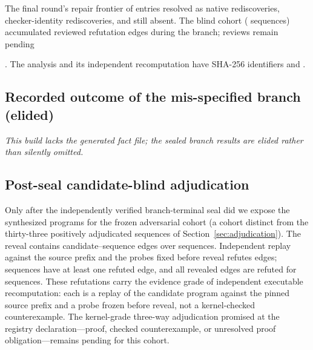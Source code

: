\documentclass[11pt]{article}
\newcommand{\digestdisplay}[1]{{\scriptsize\ttfamily
  \expandafter\seqsplit\expandafter{#1}}}
\newif\ifoeisadversarialfacts
\begin{document}
The final round's repair frontier of
\oeisTerminalGenerationThirteenRepairFrontier{} entries resolved as
\oeisTerminalGenerationThirteenNativeRediscoveries{} native rediscoveries,
\oeisTerminalGenerationThirteenCheckerOnlyRediscoveries{} checker-identity
rediscoveries, and \oeisTerminalGenerationThirteenStillAbsent{} still absent. The
blind cohort (\oeisTerminalBlindSequenceCount{} sequences) accumulated
\oeisTerminalReviewedRefutations{} reviewed refutation edges during the branch;
\oeisTerminalPendingRefutationReviews{} reviews remain pending%
\ifoeisadversarialfacts
\ (the post-seal adjudication of Section~\ref{sec:postseal-adjudication}, a distinct
cohort, produced the first refutation edges immediately after the seal)%
\fi
. The analysis and its independent recomputation have SHA-256 identifiers
\digestdisplay{\oeisTerminalAnalysisSHA} and
\digestdisplay{\oeisTerminalVerificationSHA}.
\else
\subsection{Recorded outcome of the mis-specified branch (elided)}
\emph{This build lacks the generated fact file; the sealed branch results are elided
rather than silently omitted.}
\fi

\ifoeisadversarialfacts
\subsection{Post-seal candidate-blind adjudication}
\label{sec:postseal-adjudication}

Only after the independently verified branch-terminal seal did we expose
the synthesized programs for the frozen adversarial cohort (a cohort distinct from the
thirty-three positively adjudicated sequences of Section~\ref{sec:adjudication}). The
reveal contains \oeisAdversarialCandidateEdges{} candidate--sequence edges over
\oeisAdversarialSequenceCount{} sequences. Independent replay against the source prefix
and the probes fixed before reveal refutes \oeisAdversarialRefutedEdges{} edges;
\oeisAdversarialSequencesWithRefutation{} sequences have at least one refuted edge, and
all revealed edges are refuted for \oeisAdversarialSequencesAllEdgesRefuted{} sequences.
These refutations carry the evidence grade of independent executable recomputation:
each is a replay of the candidate program against the pinned source prefix and a probe
frozen before reveal, not a kernel-checked counterexample. The kernel-grade three-way
adjudication promised at the registry declaration---proof, checked counterexample, or
unresolved proof obligation---remains pending for this cohort.
\end{document}
